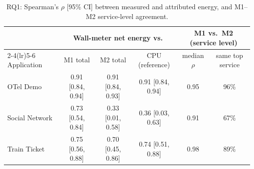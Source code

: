 \begin{table}[t]
\centering
\caption{RQ1: Spearman's $\rho$ [95\% CI] between measured and attributed energy, and M1--M2 service-level agreement.}
\label{tab:rq1}
\small
\begin{tabular}{lccccc}
\toprule
 & \multicolumn{3}{c}{Wall-meter net energy vs.} & \multicolumn{2}{c}{M1 vs.\ M2 (service level)} \\
\cmidrule(lr){2-4}\cmidrule(lr){5-6}
Application & M1 total & M2 total & CPU (reference) & median $\rho$ & same top service \\
\midrule
OTel Demo & 0.91 [0.84, 0.94] & 0.91 [0.84, 0.93] & 0.91 [0.84, 0.94] & 0.95 & 96\% \\
Social Network & 0.73 [0.54, 0.84] & 0.33 [0.01, 0.58] & 0.36 [0.03, 0.63] & 0.91 & 67\% \\
Train Ticket & 0.75 [0.56, 0.88] & 0.70 [0.45, 0.86] & 0.74 [0.51, 0.88] & 0.98 & 89\% \\
\bottomrule
\end{tabular}
\end{table}
